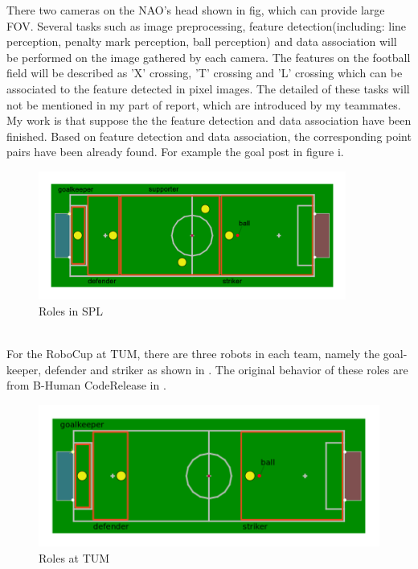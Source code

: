 There two cameras on the NAO's head shown in fig, which can provide large FOV. Several tasks such as image preprocessing, feature detection(including: line perception, penalty mark perception, ball perception) and data association will be performed on the image gathered by each camera. The features on the football field will be described as 'X' crossing, 'T' crossing and 'L' crossing which can be associated to the feature detected in pixel images. The detailed of these tasks will not be mentioned in my part of report, which are introduced by my teammates. My work is that suppose the the feature detection and data association have been finished.
Based on feature detection and data association, the corresponding point pairs have been already found. For example the goal post in figure i. 
\begin{figure}[!htb]
    \includegraphics[width=0.9\textwidth]{pics/SPL}
    \centering
    \caption{Roles in SPL}
    \label{fig: SPL}
\end{figure}\\
For the RoboCup at TUM, there are three robots in each team, namely the goal-keeper, defender and striker as shown in . The original behavior of these roles are from B-Human CodeRelease in \cite{BHumanCodeRelease2015}.
\begin{figure}[!htb]
    \centering
    \includegraphics[width=\textwidth]{pics/TUM}
    \caption{Roles at TUM}
    \label{fig: TUM}
\end{figure}

